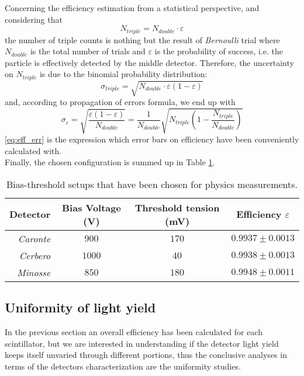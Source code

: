 Concerning the efficiency estimation from a statistical perspective, and considering that
\begin{equation}\label{eq:binomial}
N_{triple}=N_{double}\cdot\varepsilon
\end{equation}
the number of triple counts is nothing but the result of \emph{Bernoulli} trial where $N_{double}$ is the total number of trials and $\varepsilon$ is the probability of success, i.e. the particle is effectively detected by the middle detector. Therefore, the uncertainty on $N_{triple}$ is due to the binomial probability distribution:
\begin{equation}
\sigma_{triple}=\sqrt{N_{double}\cdot\varepsilon\left(1-\varepsilon\right)}
\end{equation}
and, according to propagation of errors formula, we end up with
\begin{equation}\label{eq:eff_err}
\sigma_{\varepsilon}=\sqrt{\frac{\varepsilon\left(1-\varepsilon\right)}{N_{double}}}=\displaystyle\frac{1}{N_{double}}\sqrt{N_{triple}\left(1-\frac{N_{triple}}{N_{double}}\right)}
\end{equation}
\eqref{eq:eff_err} is the expression which error bars on efficiency have been conveniently calculated with.\\

Finally, the chosen configuration is summed up in Table \ref{tab:bt-setup}.
\begin{table}[!hb]
	\centering
	\begin{tabular}{r|ccc}
		\toprule
		Detector&Bias Voltage (V)&Threshold tension (mV)&Efficiency $\varepsilon$\\
		\midrule
		\emph{Caronte} & $900$ & $170$ & $0.9937\pm 0.0013$\\
		\emph{Cerbero} & $1000$ & $40$ & $0.9938\pm 0.0013$\\
		\emph{Minosse} & $850$ & $180$ & $0.9948\pm 0.0011$\\
		\bottomrule
	\end{tabular}
	\caption{Bias-threshold setups that have been chosen for physics measurements.}
	\label{tab:bt-setup}
\end{table}


\subsection{Uniformity of light yield}

\label{sec:uniformity}

In the previous section an overall efficiency has been calculated for each scintillator, but we are interested in understanding if the detector light yield keeps itself unvaried through different portions, thus the conclusive analyses in terms of the detectors characterization are the uniformity studies.\\

